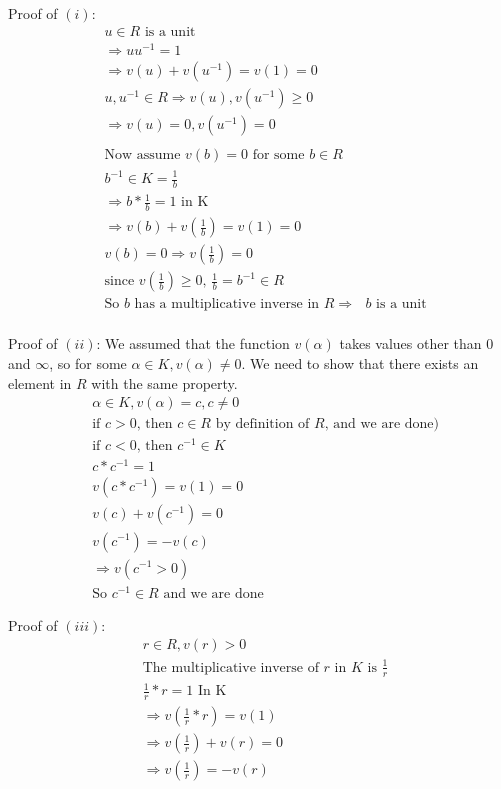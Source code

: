 \documentclass[11pt]{article}
\begin{document}
{\\
Proof of $(i)$:
\begin{align*}
&u \in R \text{ is a unit}\\
&\Rightarrow u u ^{-1} = 1\\
&\Rightarrow v(u) + v(u^{-1}) = v(1) = 0\\
& u, u^{-1} \in R \Rightarrow v(u), v(u^{-1}) \geq 0\\
&\Rightarrow v(u) = 0, v(u^{-1}) = 0\\
&\\
&\text{Now assume $v(b) = 0$ for some $b \in R$}\\
&b^{-1} \in K = \frac{1}{b}\\
&\Rightarrow b * \frac{1}{b} = 1 \text{ in K}\\
&\Rightarrow v(b) + v(\frac{1}{b}) = v(1) = 0\\
&v(b) = 0 \Rightarrow v(\frac{1}{b}) = 0\\
&\text{since $v(\frac{1}{b}) \geq 0$, $\frac{1}{b} = b^{-1} \in R$}\\
&\text{So $b$ has a multiplicative inverse in $R \Rightarrow $ $b$ is a unit}\\
\end{align*}

Proof of $(ii)$:
\newline
We assumed that the function $v(\alpha)$ takes values other than $0$ and $\infty$, so for some $\alpha \in K, v(\alpha) \neq 0$. We need to show that there exists an element in $R$ with the same property.
\begin{align*}
&\alpha \in K, v(\alpha) = c, c \neq 0\\
&\text{if $c > 0$, then $c \in R$ by definition of $R$, and we are done)}\\
&\text{if $c < 0$, then $c^{-1} \in K$}\\
&c * c^{-1} = 1\\
&v(c*c^{-1}) = v(1) = 0\\
&v(c) + v(c^{-1}) = 0\\
&v(c^{-1}) = -v(c)\\
&\Rightarrow v(c^{-1} > 0)\\
&\text{So $c^{-1} \in R$ and we are done}
\end{align*}

Proof of $(iii)$:
\newline
\begin{align*}
&r \in R, v(r) > 0\\
&\text{The multiplicative inverse of $r$ in $K$ is $\frac{1}{r}$}\\
&\frac{1}{r}*r = 1 \text{ In K}\\
&\Rightarrow v(\frac{1}{r}*r) = v(1)\\
&\Rightarrow v(\frac{1}{r})+v(r) = 0\\
&\Rightarrow v(\frac{1}{r}) = -v(r)\\
\end{align*}

}
\end{document}

